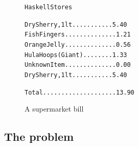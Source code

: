 \begin{figure}[t]
\begin{alltt}
                          Haskell Stores
                     
                  Dry Sherry, 1lt...........5.40
                  Fish Fingers..............1.21
                  Orange Jelly..............0.56
                  Hula Hoops (Giant)........1.33
                  Unknown Item..............0.00
                  Dry Sherry, 1lt...........5.40
                       
                  Total....................13.90
\end{alltt}
\caption{A supermarket bill}
\label{basicBill}
\end{figure}


\subsection*{The problem}

